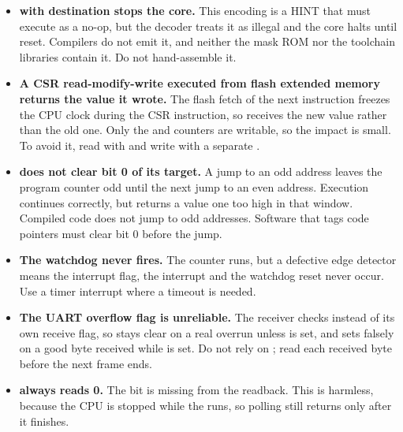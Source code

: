 \documentclass[11pt,pdftex,portrait,letterpaper]{article}
\begin{document}
\begin{itemize}
	\item \textbf{ with destination  stops the core.}
	This encoding is a HINT that must execute as a no-op, but the decoder treats it as
	illegal and the core halts until reset. Compilers do not emit it, and neither the mask
	ROM nor the toolchain libraries contain it. Do not hand-assemble it.

	\item \textbf{A CSR read-modify-write executed from flash extended memory returns the value it wrote.}
	The flash fetch of the next instruction freezes the CPU clock during the CSR instruction,
	so  receives the new value rather than the old one. Only the
	 and  counters are writable, so the impact is small.
	To avoid it, read with  and write with a separate .

	\item \textbf{ does not clear bit 0 of its target.}
	A jump to an odd address leaves the program counter odd until the next jump to an even
	address. Execution continues correctly, but  returns a value one too
	high in that window. Compiled code does not jump to odd addresses. Software that tags
	code pointers must clear bit 0 before the jump.

	\item \textbf{The watchdog never fires.}
	The counter runs, but a defective edge detector means the interrupt flag, the interrupt
	and the watchdog reset never occur. Use a timer interrupt where a timeout is needed.

	\item \textbf{The UART overflow flag is unreliable.}
	The receiver checks  instead of its own receive flag, so 
	stays clear on a real overrun unless  is set, and sets falsely on a good
	byte received while  is set. Do not rely on ; read each
	received byte before the next frame ends.

	\item \textbf{ always reads 0.}
	The bit is missing from the  readback. This is harmless, because the CPU is
	stopped while the  runs, so polling still returns only after it finishes.

\end{itemize}
\end{document}
